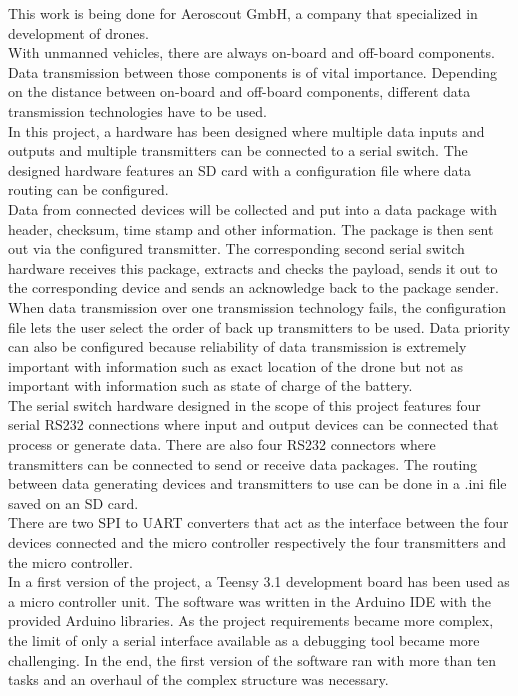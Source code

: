 %
This work is being done for Aeroscout GmbH, a company that specialized in development of drones. \\
With unmanned vehicles, there are always on-board and off-board components. Data transmission between those components is of vital importance. Depending on the distance between on-board and off-board components, different data transmission technologies have to be used. \\
In this project, a hardware has been designed where multiple data inputs and outputs and multiple transmitters can be connected to a serial switch. The designed hardware features an SD card with a configuration file where data routing can be configured. \\
Data from connected devices will be collected and put into a data package with header, checksum, time stamp and other information. The package is then sent out via the configured transmitter. The corresponding second serial switch hardware receives this package, extracts and checks the payload, sends it out to the corresponding device and sends an acknowledge back to the package sender. \\
When data transmission over one transmission technology fails, the configuration file lets the user select the order of back up transmitters to be used. Data priority can also be configured because reliability of data transmission is extremely important with information such as exact location of the drone but not as important with information such as state of charge of the battery. \\
The serial switch hardware designed in the scope of this project features four serial RS232 connections where input and output devices can be connected that process or generate data. There are also four RS232 connectors where transmitters can be connected to send or receive data packages. The routing between data generating devices and transmitters to use can be done in a .ini file saved on an SD card. \\
There are two SPI to UART converters that act as the interface between the four devices connected and the micro controller respectively the four transmitters and the micro controller. \\
In a first version of the project, a Teensy 3.1 development board has been used as a micro controller unit. The software was written in the Arduino IDE with the provided Arduino libraries. As the project requirements became more complex, the limit of only a serial interface available as a debugging tool became more challenging. In the end, the first version of the software ran with more than ten tasks and an overhaul of the complex structure was necessary.\\
